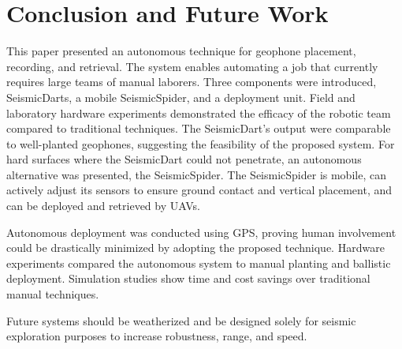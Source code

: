  \section{Conclusion and Future Work}\label{sec:Conclusion}
This paper presented an autonomous technique for geophone placement, recording, and retrieval. The system enables automating a job that currently requires large teams of manual laborers. Three components were introduced, SeismicDarts, a mobile SeismicSpider, and a deployment unit.
Field and laboratory hardware experiments demonstrated the efficacy of the robotic team compared to traditional techniques. 
The SeismicDart's output were comparable to well-planted geophones, suggesting the feasibility of the proposed system. 
For hard surfaces where the SeismicDart could not penetrate, an autonomous alternative was presented, the SeismicSpider.  
The SeismicSpider is mobile, can actively adjust its sensors to ensure ground contact and vertical placement, and can be deployed and retrieved by UAVs.

Autonomous deployment was conducted using GPS, proving human involvement could be drastically minimized by adopting the proposed technique. 
Hardware experiments compared the autonomous system to manual planting and ballistic deployment.
Simulation studies show time and cost savings over traditional manual techniques.

Future systems should be weatherized and be designed solely for seismic exploration purposes to increase robustness,  range, and speed.
